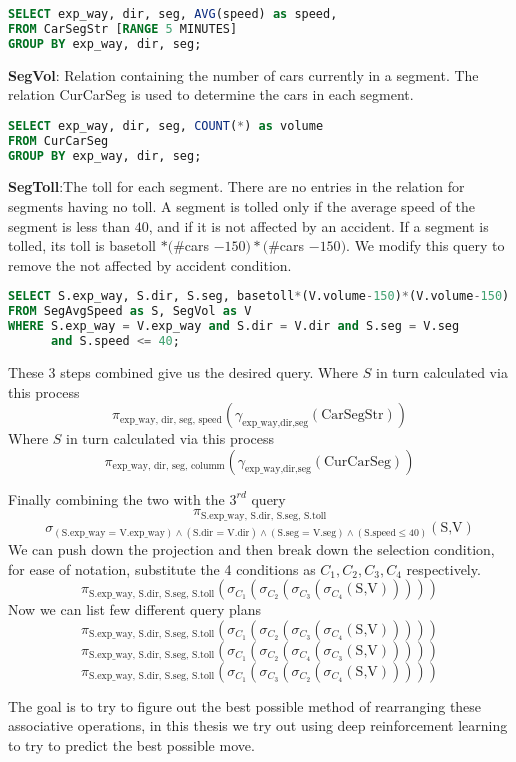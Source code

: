 \begin{lstlisting}[language=SQL]
SELECT exp_way, dir, seg, AVG(speed) as speed,
FROM CarSegStr [RANGE 5 MINUTES]
GROUP BY exp_way, dir, seg;
\end{lstlisting}


\par \textbf{SegVol}: Relation containing the number of cars currently in a segment. The relation CurCarSeg is used to determine the cars in each segment.

\begin{lstlisting}[language=SQL]
SELECT exp_way, dir, seg, COUNT(*) as volume
FROM CurCarSeg
GROUP BY exp_way, dir, seg;
\end{lstlisting}


\par \textbf{SegToll}:The toll for each segment. There are no entries in the relation for segments having no toll. A segment is tolled only if the average speed of the segment is less than $40$, and if it is not affected by an accident. If a segment is tolled, its toll is basetoll $* (\#$cars $- 150) * (\#$cars $- 150)$. We modify this query to remove the not affected by accident  condition.


\begin{lstlisting}[language=SQL]
SELECT S.exp_way, S.dir, S.seg, basetoll*(V.volume-150)*(V.volume-150)
FROM SegAvgSpeed as S, SegVol as V
WHERE S.exp_way = V.exp_way and S.dir = V.dir and S.seg = V.seg
      and S.speed <= 40;
\end{lstlisting}

These 3 steps combined give us the desired query.
Where $S$ in turn calculated via this process
$$\pi_{\text{exp\_way, dir, seg, speed}}(\gamma_{\text{exp\_way,dir,seg}} (\text{CarSegStr}))$$
Where $S$ in turn calculated via this process
$$\pi_{\text{exp\_way, dir, seg, columm}}(\gamma_{\text{exp\_way,dir,seg}} (\text{CurCarSeg}))$$

Finally combining the two with the $3^{rd}$ query 
$$\pi_{\text{S.exp\_way, S.dir, S.seg, S.toll}}$$
$$\sigma_{(\text{S.exp\_way = V.exp\_way}) \land (\text{S.dir = V.dir}) \land (\text{S.seg = V.seg})\land (\text{S.speed} \leq 40)}(\text{S,V})$$
We can push down the projection and then break down the selection condition, for ease of notation, substitute the 4 conditions as $C_1,C_2,C_3,C_4$ respectively.
$$\pi_{\text{S.exp\_way, S.dir, S.seg, S.toll}}(\sigma_{C_1}(\sigma_{C_2}(\sigma_{C_3}(\sigma_{C_4}(\text{S,V})))))$$
Now we can list few different query plans
$$\pi_{\text{S.exp\_way, S.dir, S.seg, S.toll}}(\sigma_{C_1}(\sigma_{C_2}(\sigma_{C_3}(\sigma_{C_4}(\text{S,V})))))$$
$$\pi_{\text{S.exp\_way, S.dir, S.seg, S.toll}}(\sigma_{C_1}(\sigma_{C_2}(\sigma_{C_4}(\sigma_{C_3}(\text{S,V})))))$$
$$\pi_{\text{S.exp\_way, S.dir, S.seg, S.toll}}(\sigma_{C_1}(\sigma_{C_3}(\sigma_{C_2}(\sigma_{C_4}(\text{S,V})))))$$

The goal is to try to figure out the best possible method of rearranging these associative operations, in this thesis we try out using deep reinforcement learning to try to predict the best possible move.




